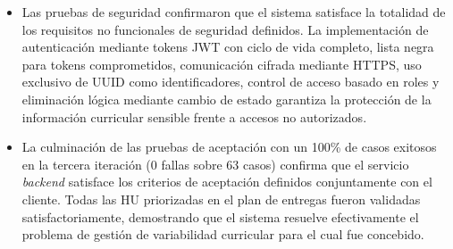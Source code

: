 \begin{itemize}
    \item Las pruebas de seguridad confirmaron que el sistema satisface la totalidad de los requisitos no funcionales de 
    seguridad definidos. La implementación de autenticación mediante tokens \ac{JWT} con ciclo de vida completo, lista negra para tokens 
    comprometidos, comunicación cifrada mediante \ac{HTTPS}, uso exclusivo de \ac{UUID} como identificadores, control de acceso basado en roles y 
    eliminación lógica mediante cambio de estado garantiza la protección de la información curricular sensible frente a accesos no autorizados.
    
    \item La culminación de las pruebas de aceptación con un 100\% de casos exitosos en la tercera iteración (0 fallas sobre 63 casos) 
    confirma que el servicio \textit{backend} satisface los criterios de aceptación definidos conjuntamente con el cliente. Todas las \ac{HU} 
    priorizadas en el plan de entregas fueron validadas satisfactoriamente, demostrando que el sistema resuelve efectivamente 
    el problema de gestión de variabilidad curricular para el cual fue concebido.
\end{itemize}
